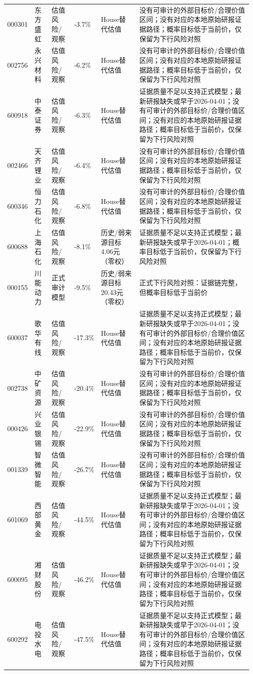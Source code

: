 \begin{longtable}{L{1.15cm}L{1.55cm}L{2.15cm}R{1.15cm}R{1.05cm}L{3.0cm}}
000301 & 东方盛虹 & 估值风险/观察 & -3.7\% & House替代估值 & 没有可审计的外部目标价/合理价值区间；没有对应的本地原始研报证据路径；概率目标低于当前价，仅保留为下行风险对照 \\
002756 & 永兴材料 & 估值风险/观察 & -6.2\% & House替代估值 & 没有可审计的外部目标价/合理价值区间；没有对应的本地原始研报证据路径；概率目标低于当前价，仅保留为下行风险对照 \\
600918 & 中泰证券 & 估值风险/观察 & -6.3\% & House替代估值 & 证据质量不足以支持正式模型；最新研报缺失或早于2026-04-01；没有可审计的外部目标价/合理价值区间；没有对应的本地原始研报证据路径；概率目标低于当前价，仅保留为下行风险对照 \\
002466 & 天齐锂业 & 估值风险/观察 & -6.4\% & House替代估值 & 没有可审计的外部目标价/合理价值区间；没有对应的本地原始研报证据路径；概率目标低于当前价，仅保留为下行风险对照 \\
600346 & 恒力石化 & 估值风险/观察 & -6.8\% & House替代估值 & 没有可审计的外部目标价/合理价值区间；没有对应的本地原始研报证据路径；概率目标低于当前价，仅保留为下行风险对照 \\
600688 & 上海石化 & 估值风险/观察 & -8.1\% & 历史/弱来源目标4.06元（零权） & 证据质量不足以支持正式模型；最新研报缺失或早于2026-04-01；概率目标低于当前价，仅保留为下行风险对照 \\
000155 & 川能动力 & 正式审计模型 & -9.5\% & 历史/弱来源目标20.43元（零权） & 正式下行风险对照：证据链完整，但概率目标低于当前价 \\
600037 & 歌华有线 & 估值风险/观察 & -17.3\% & House替代估值 & 证据质量不足以支持正式模型；最新研报缺失或早于2026-04-01；没有可审计的外部目标价/合理价值区间；没有对应的本地原始研报证据路径；概率目标低于当前价，仅保留为下行风险对照 \\
002738 & 中矿资源 & 估值风险/观察 & -20.4\% & House替代估值 & 没有可审计的外部目标价/合理价值区间；没有对应的本地原始研报证据路径；概率目标低于当前价，仅保留为下行风险对照 \\
000426 & 兴业银锡 & 估值风险/观察 & -22.9\% & House替代估值 & 没有可审计的外部目标价/合理价值区间；没有对应的本地原始研报证据路径；概率目标低于当前价，仅保留为下行风险对照 \\
001339 & 智微智能 & 估值风险/观察 & -26.7\% & House替代估值 & 没有可审计的外部目标价/合理价值区间；没有对应的本地原始研报证据路径；概率目标低于当前价，仅保留为下行风险对照 \\
601069 & 西部黄金 & 估值风险/观察 & -44.5\% & House替代估值 & 证据质量不足以支持正式模型；最新研报缺失或早于2026-04-01；没有可审计的外部目标价/合理价值区间；没有对应的本地原始研报证据路径；概率目标低于当前价，仅保留为下行风险对照 \\
600095 & 湘财股份 & 估值风险/观察 & -46.2\% & House替代估值 & 证据质量不足以支持正式模型；最新研报缺失或早于2026-04-01；没有可审计的外部目标价/合理价值区间；没有对应的本地原始研报证据路径；概率目标低于当前价，仅保留为下行风险对照 \\
600292 & 电投水电 & 估值风险/观察 & -47.5\% & House替代估值 & 证据质量不足以支持正式模型；最新研报缺失或早于2026-04-01；没有可审计的外部目标价/合理价值区间；没有对应的本地原始研报证据路径；概率目标低于当前价，仅保留为下行风险对照 \\
\bottomrule
\end{longtable}
